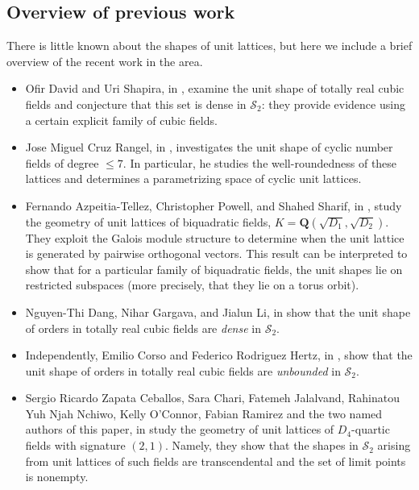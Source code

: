 \documentclass{amsart}
\newcommand{\QQ}{\mathbf{Q}}
\numberwithin{equation}{section}
\begin{document}
\subsection{Overview of previous work}
There is little known about the shapes of unit lattices, but here we include a brief overview of the recent work in the area.

\begin{itemize} 
    \item Ofir David and Uri Shapira, in \cite{DS unit shape}, examine the unit shape of totally real cubic fields and conjecture that this set is dense in $\mathcal{S}_2$: they provide evidence using a certain explicit family of cubic fields.

    \item Jose Miguel Cruz Rangel, in \cite{cyclic unit shapes}, investigates the unit shape of cyclic number fields of degree $\leq 7$. In particular, he studies the well-roundedness of these lattices and determines a parametrizing space of cyclic unit lattices. 

    \item Fernando Azpeitia-Tellez, Christopher Powell, and Shahed Sharif, in \cite{biquad unit shapes}, study the geometry of unit lattices of biquadratic fields, $K= \QQ(\sqrt{D_1}, \sqrt{D_2})$. They exploit the Galois module structure to determine when the unit lattice is generated by pairwise orthogonal vectors. This result can be interpreted to show that for a particular family of biquadratic fields, the unit shapes lie on restricted subspaces (more precisely, that they lie on a torus orbit).  

    \item Nguyen-Thi Dang, Nihar Gargava, and Jialun Li, in \cite{dang-gargava-li} show that the unit shape of orders in totally real cubic fields are \emph{dense} in $\mathcal{S}_2$.
        
    \item Independently, Emilio Corso and Federico Rodriguez Hertz, in \cite{corso-hertz}, show that the unit shape of orders in totally real cubic fields are \emph{unbounded} in $\mathcal{S}_2$.

    \item Sergio Ricardo Zapata Ceballos, Sara Chari, Fatemeh Jalalvand, Rahinatou Yuh Njah Nchiwo, Kelly O'Connor, Fabian Ramirez and the two named authors of this paper, in \cite{rnt} study the geometry of unit lattices of $D_4$-quartic fields with signature $(2,1)$. Namely, they show that the shapes in $\mathcal{S}_2$ arising from unit lattices of such fields are transcendental and the set of limit points is nonempty. 
\end{itemize}
\end{document}
